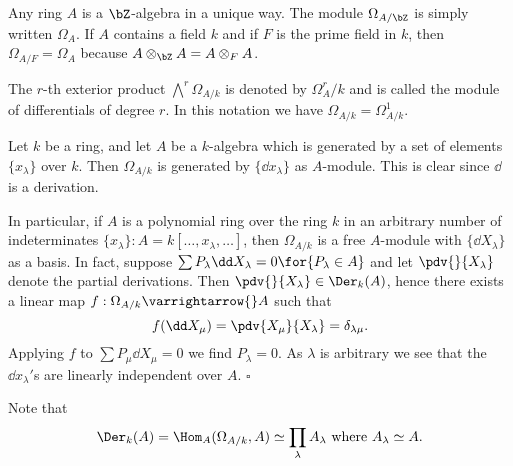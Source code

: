 \documentclass[../main]{subfiles}
\begin{document}
\newparagraph Any ring $A$ is a $\bZ$-algebra in a unique way. The module $\Omega_{A / \bZ}$ is simply written $\Omega_A$. If $A$ contains a field $k$ and if $F$ is the prime field in $k$, then $\Omega_{A / F}=\Omega_A$ because $A \otimes_\bZ A=A \otimes_F A$.

The $r$-th exterior product $\bigwedge^r \Omega_{A / k}$ is denoted by $\Omega^r_A / k$ and is called the module of differentials of degree $r$. In this notation we have $\Omega_{A / k}=\Omega^1_{A / k}$.

\begin{parexample}\label{exa:26.01}
Let $k$ be a ring, and let $A$ be a $k$-algebra which is generated by a set of elements $\{x_\lambda\}$ over $k$. Then
$\Omega_{A / k}$ is generated by $\{\dd x_\lambda\}$ as $A$-module. This is clear since $\dd$ is a derivation.
 

In particular, if $A$ is a polynomial ring over the ring $k$ in an arbitrary number of indeterminates $\{x_\lambda\}: A=k[\dots, x_\lambda, \dots]$, then $\Omega_{A / k}$ is a free $A$-module with $\{\dd X_\lambda\}$ as a basis. In fact, suppose $\sum P_\lambda \dd X_\lambda=0 \for{P_\lambda \in A}$ and let $\pdv{}{X_\lambda}$ denote the partial derivations. Then $\pdv{}{X_\lambda} \in \Der_k(A)$, hence there exists a linear map $f: \Omega_{A / k} \varrightarrow{} A$ such that \[f(\dd X_{\mu})=\pdv{X_\mu}{X_\lambda}=\delta_{\lambda \mu}. \] Applying $f$ to $\sum P_{\mu} \dd X_{\mu}=0$ we find $P_\lambda=0$. As $\lambda$ is arbitrary we see that the $\dd x_\lambda'$s are linearly independent over $A$. $\square$

Note that \[\Der_k(A)=\Hom_A(\Omega_{A/k}, A) \simeq \prod_\lambda A_\lambda\text{ where } A_\lambda \simeq A.\] 
\end{parexample}
\end{document}
